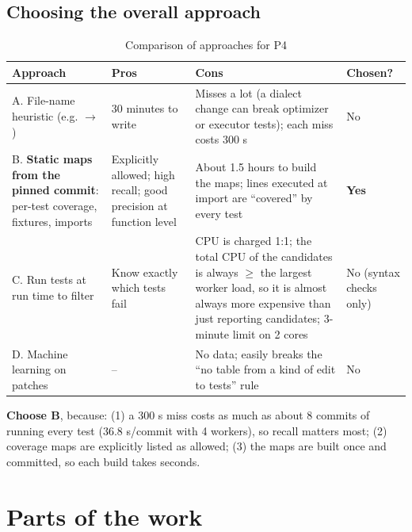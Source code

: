 \documentclass[a4paper,12pt]{article}
\newcommand{\fn}[1]{\texttt{\detokenize{#1}}}
\begin{document}
\subsection{Choosing the overall approach}
\begin{table}[H]
\centering\small
\begin{tabularx}{\textwidth}{L{3.3cm}YYC{1.7cm}}
\toprule
\textbf{Approach} & \textbf{Pros} & \textbf{Cons} & \textbf{Chosen?} \\
\midrule
A. File-name heuristic (e.g. \fn{dialects/x.py} $\rightarrow$ \fn{test_x.py}) & 30 minutes to write & Misses a lot (a dialect change can break optimizer or executor tests); each miss costs 300 s & No \\
B. \textbf{Static maps from the pinned commit}: per-test coverage, fixtures, imports & Explicitly allowed; high recall; good precision at function level & About 1.5 hours to build the maps; lines executed at import are ``covered'' by every test & \textbf{Yes} \\
C. Run tests at run time to filter & Know exactly which tests fail & CPU is charged 1:1; the total CPU of the candidates is always $\ge$ the largest worker load, so it is almost always more expensive than just reporting candidates; 3-minute limit on 2 cores & No (syntax checks only) \\
D. Machine learning on patches & -- & No data; easily breaks the ``no table from a kind of edit to tests'' rule & No \\
\bottomrule
\end{tabularx}
\caption{Comparison of approaches for P4}
\end{table}

\textbf{Choose B}, because: (1) a 300 s miss costs as much as about 8 commits of running every test (36.8 s/commit with 4 workers), so recall matters most; (2) coverage maps are explicitly listed as allowed; (3) the maps are built once and committed, so each build takes seconds.

\newpage
\section{Parts of the work}

\end{document}
